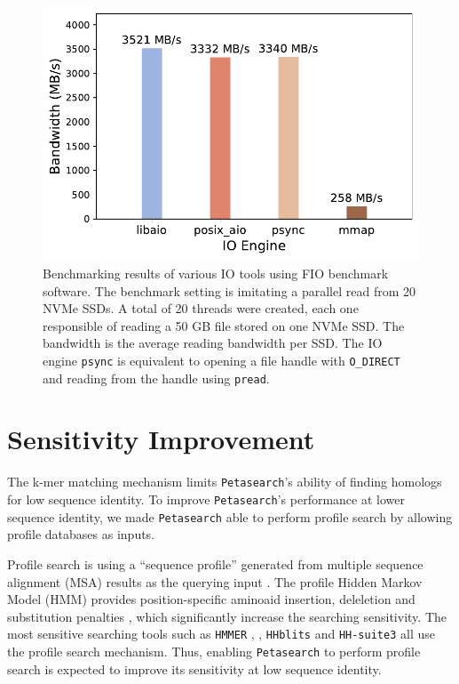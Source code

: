 \begin{figpage}
\begin{figure}[htbp]
    \label{fig:prot_seq_compress}
    \bigskip
    \centering
    \includegraphics[width=.65\textwidth]{images/fio_benchmark.pdf}
    \caption{Benchmarking results of various IO tools using FIO benchmark software.
      The benchmark setting is imitating a parallel read from 20 NVMe SSDs.
      A total of 20 threads were created, each one responsible of reading a 50 GB file stored on one NVMe SSD.
      The bandwidth is the average reading bandwidth per SSD.
      The IO engine \texttt{psync} is equivalent to opening a file handle with \texttt{O\_DIRECT} and reading from the handle using \texttt{pread}.}
    \label{fig:fio_benchmark}
  \end{figure}
\end{figpage}

\section{Sensitivity Improvement} \label{section:sensitivity-improvement}

The k-mer matching mechanism limits \texttt{Petasearch}'s ability of finding homologs for low sequence identity.
To improve \texttt{Petasearch}'s performance at lower sequence identity, we made \texttt{Petasearch} able to perform profile search by allowing profile databases as inputs.

Profile search is using a ``sequence profile'' generated from multiple sequence alignment (MSA) results as the querying input \cite{steinegger_hh-suite3_2019}.
The profile Hidden Markov Model (HMM) provides position-specific aminoaid insertion, deleletion and substitution penalties \cite{steinegger2019hh}, which significantly increase the searching sensitivity.
The most sensitive searching tools such as \texttt{HMMER} \cite{eddy_new_2009}, \cite{eddy_accelerated_2011}, \texttt{HHblits} \cite{remmert_hhblits_2012} and \texttt{HH-suite3} \cite{steinegger_hh-suite3_2019} all use the profile search mechanism.
Thus, enabling \texttt{Petasearch} to perform profile search is expected to improve its sensitivity at low sequence identity.

